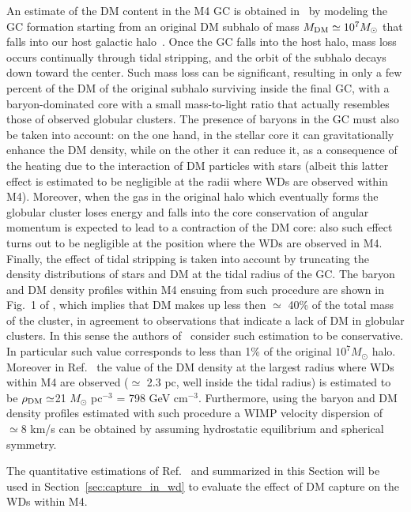 \documentclass[11pt]{article}
\begin{document}
An estimate of the DM content in the M4 GC is obtained in~\cite{idm_wd_2010} by modeling the GC formation starting from an original DM subhalo of mass $M_{\rm DM} \simeq 10^7 M_\odot$ that falls into our host galactic halo~\cite{gc_peebles_1984}. Once the GC falls into the host halo, mass loss occurs continually through tidal stripping, and the orbit of the subhalo decays down toward the center. Such mass loss can be significant, resulting in only a few percent of the DM of the original subhalo surviving inside the final GC, with a baryon-dominated core with a small mass-to-light ratio that actually resembles those of observed globular clusters. The presence of baryons in the GC must also be taken into account: on the one hand, in the stellar core it can  gravitationally enhance the DM density, while on the other it can reduce it, as a consequence of the heating due to the interaction of DM particles with stars (albeit this latter effect is estimated to be negligible at the radii where WDs are observed within M4). Moreover, when the gas in the original halo which eventually forms the globular cluster loses energy and falls into the core conservation of angular momentum is expected to lead to a contraction of the DM core: also such effect turns out to be negligible at the position where the WDs are observed in M4. Finally, the effect of tidal stripping is taken into account by truncating the density distributions of stars and DM at the tidal radius of the GC. The baryon and DM density profiles within M4 ensuing from such procedure are shown in Fig.~1 of \cite{idm_wd_2010}, which implies that DM makes up less then $\simeq$ 40\% of the total mass of the cluster, in agreement to observations that indicate a lack of DM in globular clusters. In this sense the authors of~\cite{idm_wd_2010} consider such estimation to be conservative. In particular such value corresponds to less than 1\% of the original $10^7 M_{\odot}$ halo. Moreover in Ref.~\cite{idm_wd_2010} the value of the DM density at the largest radius where WDs within M4 are observed ($\simeq$ 2.3 pc, well inside the tidal radius) is estimated to be $\rho_{\rm DM}\simeq$21 $M_\odot$ pc$^{-3}$ = 798 GeV cm$^{-3}$. Furthermore, using the baryon and DM density profiles estimated with such procedure a WIMP velocity dispersion of $\simeq 8$ km/s can be obtained by assuming hydrostatic equilibrium and spherical symmetry.

The quantitative estimations of Ref.~\cite{idm_wd_2010} and summarized in this Section will be used in Section~\ref{sec:capture_in_wd} to evaluate the effect of DM capture on the WDs within M4.
\end{document}
